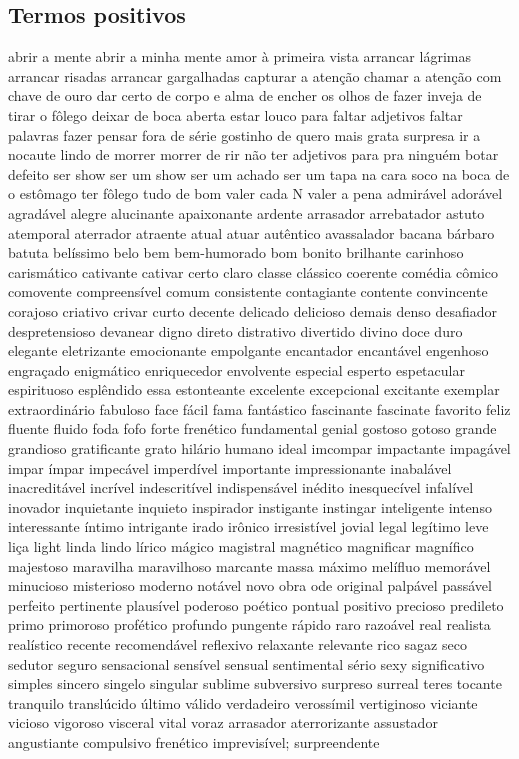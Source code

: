 \subsection{Termos positivos}
abrir a mente abrir a minha mente amor \`{a} primeira vista arrancar l\'{a}grimas arrancar risadas arrancar gargalhadas capturar a aten\c{c}\~ao chamar a aten\c{c}\~ao com chave de ouro dar certo de corpo e alma de encher os olhos de fazer inveja de tirar o f\^{o}lego deixar de boca aberta estar louco para faltar adjetivos faltar palavras fazer pensar fora de s\'{e}rie gostinho de quero mais grata surpresa ir a nocaute lindo de morrer morrer de rir n\~ao ter adjetivos para pra ningu\'{e}m botar defeito ser show ser um show ser um achado ser um tapa na cara soco na boca de o est\^{o}mago ter f\^{o}lego tudo de bom valer cada N valer a pena admir\'{a}vel ador\'{a}vel agrad\'{a}vel alegre alucinante apaixonante ardente arrasador arrebatador astuto atemporal aterrador atraente atual atuar aut\^{e}ntico avassalador bacana b\'{a}rbaro batuta bel\'{i}ssimo belo bem bem-humorado bom bonito brilhante carinhoso carism\'{a}tico cativante cativar certo claro classe cl\'{a}ssico coerente com\'{e}dia c\^{o}mico comovente compreens\'{i}vel comum consistente contagiante contente convincente corajoso criativo crivar curto decente delicado delicioso demais denso desafiador despretensioso devanear digno direto distrativo divertido divino doce duro elegante eletrizante emocionante empolgante encantador encant\'{a}vel engenhoso engra\c{c}ado enigm\'{a}tico enriquecedor envolvente especial esperto espetacular espirituoso espl\^{e}ndido essa estonteante excelente excepcional excitante exemplar extraordin\'{a}rio fabuloso face f\'{a}cil fama fant\'{a}stico fascinante fascinate favorito feliz fluente fluido foda fofo forte fren\'{e}tico fundamental genial gostoso gotoso grande grandioso gratificante grato hil\'{a}rio humano ideal imcompar impactante impag\'{a}vel impar \'{i}mpar impec\'{a}vel imperd\'{i}vel importante impressionante inabal\'{a}vel inacredit\'{a}vel incr\'{i}vel indescrit\'{i}vel indispens\'{a}vel in\'{e}dito inesquec\'{i}vel infal\'{i}vel inovador inquietante inquieto inspirador instigante instingar inteligente intenso interessante \'{i}ntimo intrigante irado ir\^{o}nico irresist\'{i}vel jovial legal leg\'{i}timo leve li\c{c}a light linda lindo l\'{i}rico m\'{a}gico magistral magn\'{e}tico magnificar magn\'{i}fico majestoso maravilha maravilhoso marcante massa m\'{a}ximo mel\'{i}fluo memor\'{a}vel minucioso misterioso moderno not\'{a}vel novo obra ode original palp\'{a}vel pass\'{a}vel perfeito pertinente plaus\'{i}vel poderoso po\'{e}tico pontual positivo precioso predileto primo primoroso prof\'{e}tico profundo pungente r\'{a}pido raro razo\'{a}vel real realista real\'{i}stico recente recomend\'{a}vel reflexivo relaxante relevante rico sagaz seco sedutor seguro sensacional sens\'{i}vel sensual sentimental s\'{e}rio sexy significativo simples sincero singelo singular sublime subversivo surpreso surreal teres tocante tranquilo transl\'{u}cido \'{u}ltimo v\'{a}lido verdadeiro veross\'{i}mil vertiginoso viciante vicioso vigoroso visceral vital voraz arrasador aterrorizante assustador angustiante compulsivo fren\'{e}tico imprevis\'{i}vel; surpreendente 